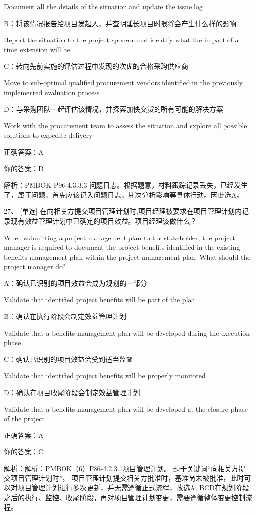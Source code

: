 Document all the details of the situation and update the issue log

B：将该情况报告给项目发起人，并查明延长项目时限将会产生什么样的影响

Report the situation to the project sponsor and identify what the impact of a time extension will be

C：转向先前实施的评估过程中发现的次优的合格采购供应商

Move to sub-optimal qualified procurement vendors identified in the previously implemented evaluation process

D：与采购团队一起评估该情况，并探索加快交货的所有可能的解决方案

Work with the procurement team to assess the situation and explore all possible solutions to expedite delivery

正确答案：A

你的答案：D

解析：PMBOK P96 4.3.3.3 问题日志。根据题意，材料跟踪记录丢失，已经发生了，属于问题，首先应该记入问题日志，其次分析影响等具体行动。因此选A。

27、 [单选] 在向相关方提交项目管理计划时,项目经理被要求在项目管理计划内记录现有效益管理计划中已确定的项目效益。项目经理该做什么？

When submitting a project management plan to the stakeholder, the project manager is required to document the project benefits identified in the existing benefits management plan within the project management plan. What should the project manager do?

A：确认已识别的项目效益会成为规划的一部分

Validate that identified project benefits will be part of the plan

B：确认在执行阶段会制定效益管理计划

Validate that a benefits management plan will be developed during the execution phase

C：确认已识别的项目效益会受到适当监督

Validate that identified project benefits will be properly monitored

D：确认在项目收尾阶段会制定效益管理计划

Validate that a benefits management plan will be developed at the closure phase of the project

正确答案：A

你的答案：C

解析：解析：PMBOK（6）P86-4.2.3.1项目管理计划。 题干关键词“向相关方提交项目管理计划时”。 项目管理计划提交相关方批准时，基准尚未被批准，此时可以对项目管理计划进行多次更新，并无需遵循正式流程，故选A; BCD在规划阶段之后的执行、监控、收尾阶段，再对项目管理计划变更，需要遵循整体变更控制流程。

